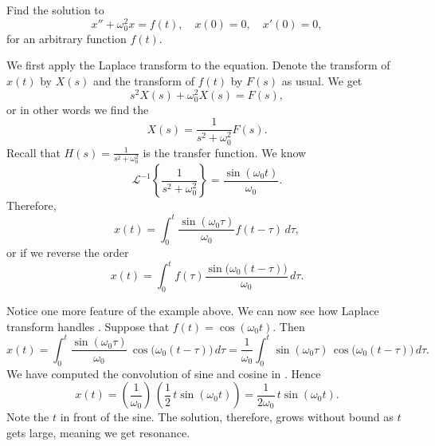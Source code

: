 \begin{example} \label{example:undampedforcedbylaplacearbitrhs}
Find the solution to
\begin{equation*}
x'' + \omega_0^2 x = f(t) , \quad x(0) = 0, \quad x'(0) = 0 ,
\end{equation*}
for an arbitrary function $f(t)$.

We first apply the Laplace transform to the equation.  Denote
the transform of $x(t)$ by $X(s)$ and the transform of $f(t)$ by
$F(s)$ as usual.  We get
\begin{equation*}
s^2 X(s) + \omega_0^2 X(s) = F(s) ,
\end{equation*}
or in other words we find the 
\begin{equation*}
X(s) = \frac{1}{s^2+ \omega_0^2} F(s).
\end{equation*}
Recall that $H(s) = \frac{1}{s^2+ \omega_0^2}$ is the transfer function.
We know
\begin{equation*}
{\mathcal{L}}^{-1} \left\{
\frac{1}{s^2+ \omega_0^2}
\right\} = 
\frac{\sin (\omega_0 t)}{\omega_0} .
\end{equation*}
Therefore,
\begin{equation*}
x(t) = 
\int_0^t
\frac{\sin (\omega_0 \tau)}{\omega_0}
f(t-\tau) \, d\tau ,
\end{equation*}
or if we reverse the order
\begin{equation*}
x(t) = 
\int_0^t
f(\tau) 
\frac{\sin \bigl( \omega_0 (t-\tau) \bigr)}{\omega_0} \, d\tau .
\end{equation*}
\end{example}

Notice one more feature of the example above.
We can now see how Laplace transform
handles .  Suppose that $f(t) =
\cos (\omega_0 t)$.  Then
\begin{equation*}
x(t) = 
\int_0^t
\frac{\sin (\omega_0 \tau)}{\omega_0} \,
\cos \bigl( \omega_0 (t-\tau) \bigr) \, d\tau
=
\frac{1}{\omega_0}
\int_0^t
\sin ( \omega_0 \tau ) \,
\cos \bigl(\omega_0 (t-\tau) \bigr) \, d\tau .
\end{equation*}
We have computed the convolution of sine and cosine in
.  Hence
\begin{equation*}
x(t) =
\left(
\frac{1}{\omega_0}
\right) \,
\left(
\frac{1}{2} \,
t
\sin ( \omega_0 t )
\right)
=
\frac{1}{2 \omega_0} \,
t
\sin ( \omega_0 t ).
\end{equation*}
Note the $t$ in front of the sine.  The solution, therefore, grows without
bound as $t$ gets large, meaning we get resonance.

